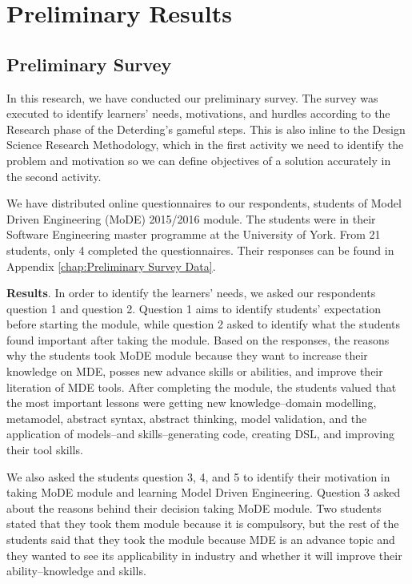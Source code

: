 \documentclass[12pt, a4paper]{report}
\begin{document}
\chapter{Preliminary Results}

\section{Preliminary Survey}
In this research, we have conducted our preliminary survey. The survey was executed to identify learners' needs, motivations, and hurdles according to the Research phase of the Deterding's gameful steps. This is also inline to the Design Science Research Methodology, which in the first activity we need to identify the problem and motivation so we can define objectives of a solution accurately in the second activity. 

We have distributed online questionnaires to our respondents, students of Model Driven Engineering (MoDE) 2015/2016 module. The students were in their Software Engineering master programme at the University of York. From 21 students, only 4 completed the questionnaires. Their responses can be found in Appendix \autoref{chap:Preliminary Survey Data}.

\textbf{Results}. In order to identify the learners' needs, we asked our respondents question 1 and question 2. Question 1 aims to identify students' expectation before starting the module, while question 2 asked to identify what the students found important after taking the module. Based on the responses, the reasons why the students took MoDE module because they want to increase their knowledge on MDE, posses new advance skills or abilities, and improve their literation of MDE tools. After completing the module, the students valued that the most important lessons were getting new knowledge--domain modelling, metamodel, abstract syntax, abstract thinking, model validation, and the application of models--and skills--generating code, creating DSL, and improving their tool skills.   

We also asked the students question 3, 4, and 5 to identify their motivation in taking MoDE module and learning Model Driven Engineering.  Question 3 asked about the reasons behind their decision taking MoDE module. Two students stated that they took them module because it is compulsory, but the rest of the students said that they took the module because MDE is an advance topic and they wanted to see its applicability in industry and whether it will improve their ability--knowledge and skills. 
\end{document}
